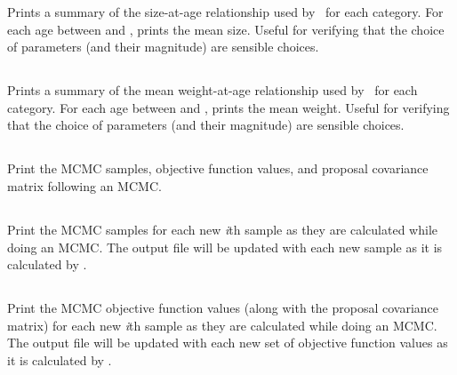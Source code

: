Prints a summary of the size-at-age relationship used by \SPM\ for each category. For each age between  and , prints the mean size. Useful for verifying that the choice of parameters (and their magnitude) are sensible choices.

\subsection{\label{sec:report-age-weight}}

Prints a summary of the mean weight-at-age relationship used by \SPM\ for each category. For each age between  and , prints the mean weight. Useful for verifying that the choice of parameters (and their magnitude) are sensible choices.

\subsection{}

Print the MCMC samples, objective function values, and proposal covariance matrix following an MCMC.

\subsection{}

Print the MCMC samples for each new \textit{i}th sample as they are calculated while doing an MCMC. The output file will be updated with each new sample as it is calculated by \SPM.

\subsection{}

Print the MCMC objective function values (along with the proposal covariance matrix) for each new \textit{i}th sample as they are calculated while doing an MCMC. The output file will be updated with each new set of objective function values as it is calculated by \SPM.
